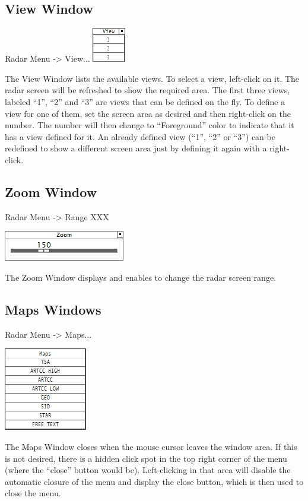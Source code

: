 \documentclass[11pt,a4paper,oldfontcommands]{memoir}
\begin{document}
\subsection{View Window}
\label{win:view}
Radar Menu -> View...
\includegraphics{img/viewmenu.png}

The View Window lists the available views. To select a view, left-click on it. The radar screen will be refreshed to show the required area. The first three views, labeled “1”, “2” and “3” are views that can be defined on the fly. To define a view for one of them, set the screen area as desired and then right-click on the number. The number will then change to “Foreground” color to indicate that it has a view defined for it. An already defined view (“1”, “2” or “3”) can be redefined to show a different screen area just by defining it again with a right-click.

\subsection{Zoom Window}
\label{win:zoom}
Radar Menu -> Range XXX

\includegraphics{img/zoom.png}

The Zoom Window displays and enables to change the radar screen range.

\subsection{Maps Windows}
\label{win:mapsw}

Radar Menu -> Maps...

\includegraphics{img/mapsmenu.png}

The Maps Window closes when the mouse cursor leaves the window area. If this is not desired, there is a
hidden click spot in the top right corner of the menu (where the “close” button would be). Left-clicking in
that area will disable the automatic closure of the menu and display the close button, which is then used to
close the menu.
\end{document}
